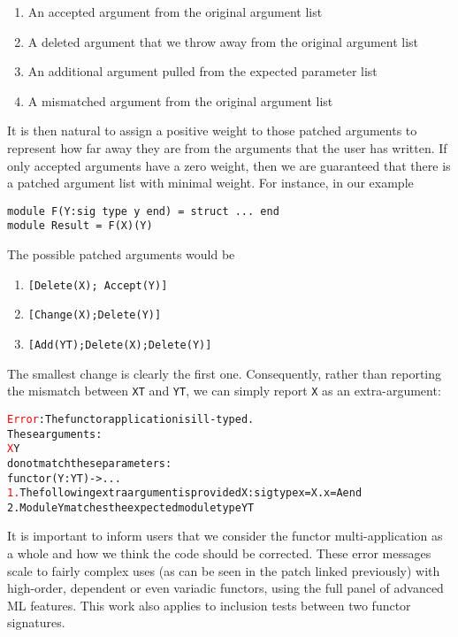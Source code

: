\documentclass[a4paper,11pt]{scrartcl}
\newcommand{\error}[1]{\textcolor{red}{#1}}
\newcommand{\ok}[1]{\textcolor{OliveGreen}{#1}}
\begin{document}
\begin{enumerate}
\item An accepted argument from the original argument list
\item A deleted argument that we throw away from the original argument list
\item An additional argument pulled from the expected parameter list
\item A mismatched argument from the original argument list
\end{enumerate}

It is then natural to assign a positive weight to those patched arguments to represent how far away they
are from the arguments that the user has written.
If only accepted arguments have a zero weight, then we are guaranteed that there is a patched argument list
with minimal weight.
%
For instance, in our example

\begin{verbatim}
module F(Y:sig type y end) = struct ... end
module Result = F(X)(Y)
\end{verbatim}

The possible patched arguments would be

\begin{enumerate}
\item \texttt{[Delete(X); Accept(Y)]}
\item \texttt{[Change(X);Delete(Y)]}
\item \texttt{[Add(YT);Delete(X);Delete(Y)]}
\end{enumerate}

The smallest change is clearly the first one. Consequently, rather than reporting
the mismatch between \texttt{XT} and \texttt{YT}, we can simply report \texttt{X}
as an extra-argument:
\begin{alltt}
\error{Error}: The functor application is ill-typed.
       These arguments:
         \error{X} \ok{Y}
       do not match these parameters:
         functor  \ok{(Y : YT)} -> ...
  \error{1.} The following extra argument is provided X : sig type x = X.x = A end
  \ok{2.} Module Y matches the expected module type YT
\end{alltt}

It is important to inform users that we consider the
functor multi-application as a whole and how we think the code should be corrected.
These error messages scale to fairly complex uses (as can be seen in the
patch linked previously) with high-order, dependent or even variadic functors,
using the full panel of advanced ML features.
This work also applies to inclusion tests between two functor signatures.
\end{document}
